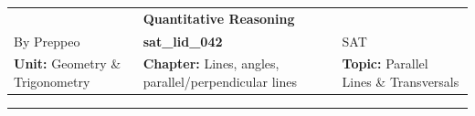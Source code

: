 \documentclass[11pt,paper=a4,answers]{exam}
\begin{document}
\begin{center}
    \centering
    \renewcommand{\arraystretch}{1.5}
    \begin{tabularx}{\textwidth}{YYY}
    & \normalsize\bf{{\Large{{Quantitative Reasoning}}}} & \\
    By Preppeo & \normalsize\bf{{sat\_lid\_042}} & SAT\\
    \normalsize{{\textbf{{Unit:}} Geometry \& Trigonometry}} & \normalsize{{\textbf{{Chapter:}} Lines, angles, parallel/perpendicular lines}} & \normalsize{{\textbf{{Topic:}} Parallel Lines \& Transversals}} \\
    \end{tabularx}
\end{center}
\par\noindent\rule{\textwidth}{1pt}
\end{document}
